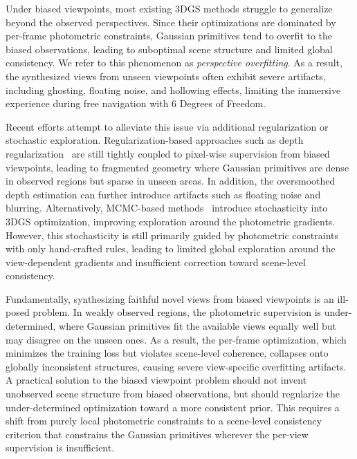 \documentclass[lettersize,journal]{IEEEtran}
\begin{document}
Under biased viewpoints, most existing 3DGS methods struggle to generalize beyond the observed perspectives. Since their optimizations are dominated by per-frame photometric constraints, 
Gaussian primitives tend to overfit to the biased observations, leading to suboptimal scene structure and limited global consistency. We refer to this phenomenon as \emph{perspective overfitting}.
As a result, the synthesized views from unseen viewpoints often exhibit severe artifacts, including ghosting, floating noise, and hollowing effects, 
limiting the immersive experience during free navigation with 6 Degrees of Freedom. 

Recent efforts attempt to alleviate this issue via additional regularization or stochastic exploration. Regularization-based approaches such as depth regularization~\cite{pgsr,hierarchical,mpgs}
are still tightly coupled to pixel-wise supervision from biased viewpoints, 
leading to fragmented geometry where Gaussian primitives are dense in observed regions but sparse in unseen areas.
In addition, the oversmoothed depth estimation can further introduce artifacts such as floating noise and blurring.
Alternatively, MCMC-based methods~\cite{mcmc,mh3dgs} introduce stochasticity into 3DGS optimization,
improving exploration around the photometric gradients.
However, this stochasticity is still primarily guided by photometric constraints with only hand-crafted rules, leading to limited global exploration around the view-dependent gradients and insufficient correction toward scene-level consistency.

Fundamentally, synthesizing faithful novel views from biased viewpoints is an ill-posed problem. 
In weakly observed regions, the photometric supervision is under-determined, where Gaussian primitives fit the available views equally well but may disagree on the unseen ones. As a result, the per-frame optimization, which minimizes the training loss but violates scene-level coherence, collapses onto globally inconsistent structures, causing severe view-specific overfitting artifacts.
A practical solution to the biased viewpoint problem should not invent unobserved scene structure from biased observations, but should regularize the under-determined optimization toward a more consistent prior.
This requires a shift from purely local photometric constraints to a scene-level consistency criterion that constrains the Gaussian primitives wherever the per-view supervision is insufficient.
\end{document}
